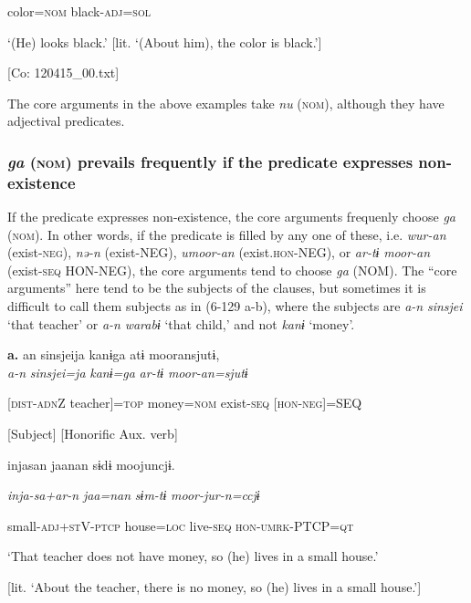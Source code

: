       color=\textsc{nom}  black-\textsc{adj}=\textsc{sol}

\glt ‘(He) looks black.’ [lit. ‘(About him), the color is black.’]

      [Co: 120415\_00.txt]
\z

The core arguments in the above examples take \textit{nu} (\textsc{nom}), although they have adjectival predicates.

\subsubsection{\textit{ga} (\textsc{nom}) prevails frequently if the predicate expresses non-existence}

If the predicate expresses non-existence, the core arguments frequenly choose \textit{ga} (\textsc{nom}). In other words, if the predicate is filled by any one of these, i.e. \textit{wur-an} (exist-\textsc{neg}), \textit{nə-n} (exist-NEG), \textit{umoor-an} (exist.\textsc{hon}-NEG), or \textit{ar-tɨ} \textit{moor-an} (exist-\textsc{seq} HON-NEG), the core arguments tend to choose \textit{ga} (NOM). The “core arguments” here tend to be the subjects of the clauses, but sometimes it is difficult to call them subjects as in (6-129 a-b), where the subjects are \textit{a-n} \textit{sinsjei} ‘that teacher’ or \textit{a-n} \textit{warabɨ} ‘that child,’ and not \textit{kanɨ} ‘money’.

\ea\label{ex:6-129}
 \textbf{a.}  {\TM}  an  sinsjeija  kanɨga  atɨ  mooransjutɨ,\\

      \textit{a-n}  \textit{sinsjei=ja}  \textit{kanɨ=ga}  \textit{ar-tɨ}  \textit{moor-an=sjutɨ}

      [\textsc{dist}-\textsc{adn}Z  teacher]=\textsc{top}  money=\textsc{nom}  exist-\textsc{seq}  [\textsc{hon}-\textsc{neg}]=SEQ

      [Subject]      [Honorific Aux. verb]

      injasan  jaanan  sɨdɨ  moojuncjɨ.

      \textit{inja-sa+ar-n}  \textit{jaa=nan}  \textit{sɨm-tɨ}  \textit{moor-jur-n=ccjɨ}

      small-\textsc{adj}+\textsc{st}V-\textsc{ptcp}  house=\textsc{loc}  live-\textsc{seq}  \textsc{hon}-\textsc{umrk}-PTCP=\textsc{qt}

\glt ‘That teacher does not have money, so (he) lives in a small house.’

[lit. ‘About the teacher, there is no money, so (he) lives in a small house.’]

